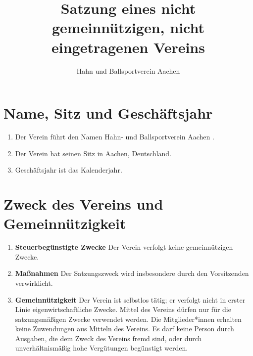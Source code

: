 \documentclass{scrartcl}
\title{Satzung eines nicht gemeinnützigen, nicht eingetragenen Vereins}
\author{Hahn und Ballsportverein Aachen}
\begin{document}
    \maketitle
    \section{Name, Sitz und Geschäftsjahr}
        \begin{enumerate}
            \item Der Verein führt den Namen \dq Hahn- und Ballsportverein Aachen \dq.
            \item Der Verein hat seinen Sitz in Aachen, Deutschland.
            \item Geschäftsjahr ist das Kalenderjahr.
        \end{enumerate}
    \section{Zweck des Vereins und Gemeinnützigkeit}
        \begin{enumerate}
            \item \textbf{Steuerbegünstigte Zwecke} \newline
                Der Verein verfolgt keine gemeinnützigen Zwecke.
            \item \textbf{Maßnahmen} \newline
                Der Satzungszweck wird insbesondere durch den Vorsitzenden verwirklicht.
            \item \textbf{Gemeinnützigkeit} \newline
                Der Verein ist selbstlos tätig; er verfolgt nicht in erster Linie eigenwirtschaftliche Zwecke. Mittel
                des Vereins dürfen nur für die satzungsmäßigen Zwecke verwendet werden. Die
                Mitglieder*innen erhalten keine Zuwendungen aus Mitteln des Vereins. Es darf keine Person
                durch Ausgaben, die dem Zweck des Vereins fremd sind, oder durch unverhältnismäßig hohe
                Vergütungen begünstigt werden.
        \end{enumerate}
\end{document}
